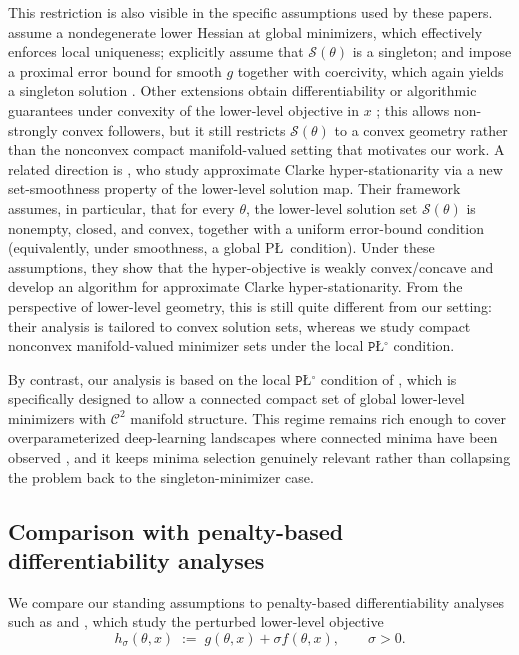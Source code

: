 \documentclass{article}
\theoremstyle{normaltheorem}
\newcommand{\PLcirc}{\texttt{P\L$^\circ$}}
\newcommand{\calS}{\mathcal{S}}
\begin{document}
This restriction is also visible in the specific assumptions used by these papers. \citet{huang2024optimal} assume a
nondegenerate lower Hessian at global minimizers, which effectively enforces local uniqueness; \citet{liu2022bome}
explicitly assume that \(\calS(\theta)\) is a singleton; and \citet{kwon2023penalty} impose a proximal error bound for
smooth \(g\) together with coercivity, which again yields a singleton solution
\citep[cf. Prop.~C.1]{chen2023bilevel}. Other extensions obtain differentiability or algorithmic guarantees under
convexity of the lower-level objective in \(x\) \citep{xiao2023generalized,shen2025penalty}; this allows non-strongly
convex followers, but it still restricts \(\calS(\theta)\) to a convex geometry rather than the nonconvex compact
manifold-valued setting that motivates our work. A related direction is \citet{chen2025setsmoothness}, who study approximate Clarke hyper-stationarity via a new
set-smoothness property of the lower-level solution map. Their framework assumes, in particular, that for every
\(\theta\), the lower-level solution set \(\calS(\theta)\) is nonempty, closed, and convex, together with a uniform
error-bound condition (equivalently, under smoothness, a global P\L\ condition). Under these assumptions, they show that
the hyper-objective is weakly convex/concave and develop an algorithm for approximate Clarke hyper-stationarity. From the
perspective of lower-level geometry, this is still quite different from our setting: their analysis is tailored to
convex solution sets, whereas we study compact nonconvex manifold-valued minimizer sets under the local
\(\PLcirc\) condition.

By contrast, our analysis is based on the local \(\PLcirc\) condition of \citet{gong2024poincare}, which is specifically
designed to allow a connected compact set of global lower-level minimizers with \(\mathcal{C}^{2}\) manifold structure. This
regime remains rich enough to cover overparameterized deep-learning landscapes where connected minima have been observed
\citep{draxler2018essentially,garipov2018loss,nguyen2019connected}, and it keeps minima selection genuinely relevant rather
than collapsing the problem back to the singleton-minimizer case.

\subsection{Comparison with penalty-based differentiability analyses}\label{append:penalty-diff}
We compare our standing assumptions to penalty-based differentiability analyses such as \citet{kwon2023penalty} and \citet{chen2023bilevel}, which study the perturbed lower-level objective
\[
h_\sigma(\theta,x)\;:=\;g(\theta,x)+\sigma f(\theta,x),\qquad \sigma>0.
\]
\end{document}
